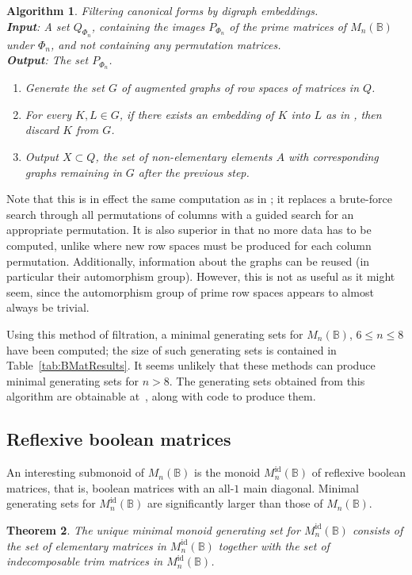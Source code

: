 \documentclass[11pt]{article}
\newtheorem{thm}{Theorem}[subsection]
\newtheorem{algo}[thm]{Algorithm}
\newenvironment{alg}{\begin{algo}\rm}{\end{algo}}
\numberwithin{equation}{section}
\newcommand{\B}{\mathbb{B}}
\newcommand{\Bn}{M_n(\B)}
\newcommand{\Refln}{M_n^{\text{id}}(\B)}
\begin{document}
\begin{alg}
   Filtering canonical forms by digraph embeddings.\\
  \textbf{Input}: A set $Q_{\Phi_n}$, containing the images $P_{\Phi_n}$ of the
  prime matrices of $\Bn$ under $\Phi_n$, and not containing any permutation
  matrices. \\
  \textbf{Output}: The set $P_{\Phi_n}$.
  \begin{enumerate}
  \item
    Generate the set $G$ of augmented graphs of row spaces of matrices in $Q$.
  \item 
    For every $K, L \in G$, if there exists an embedding of $K$ into $L$ as in
    , then discard $K$ from $G$.
  \item
    Output $X\subset Q$, the set of non-elementary elements $A$ with
    corresponding graphs remaining in $G$ after the previous step.
\end{enumerate}
\end{alg}

Note that this is in effect the same computation as in ; it
replaces a brute-force search through all permutations of columns with a guided
search for an appropriate permutation. It is also superior in that no more data
has to be computed, unlike  where new row spaces must be
produced for each column permutation. Additionally, information about the graphs
can be reused (in particular their automorphism group). However, this is not as
useful as it might seem, since the automorphism group of prime row spaces
appears to almost always be trivial.

Using this method of filtration, a minimal generating sets for $\Bn$, $6 \leq n
\leq 8$ have been computed; the size of such generating sets is contained in
Table~\ref{tab:BMatResults}. It seems unlikely that these methods can produce
minimal generating sets for $n > 8$. The generating sets obtained from this
algorithm are obtainable at~\cite{Results2020aa}, along with code to produce
them.

\subsection{Reflexive boolean matrices}
\label{sec:RefBoolMat}
An interesting submonoid of $\Bn$ is the monoid $\Refln$ of reflexive boolean
matrices, that is, boolean matrices with an all-$1$ main diagonal. Minimal
generating sets for $\Refln$ are significantly larger than those of $\Bn$.
\begin{thm}
  The unique minimal monoid generating set for $\Refln$ consists of the set of
  elementary matrices in $\Refln$ together with the set of indecomposable trim
  matrices in $\Refln$.
\end{thm}
\end{document}
